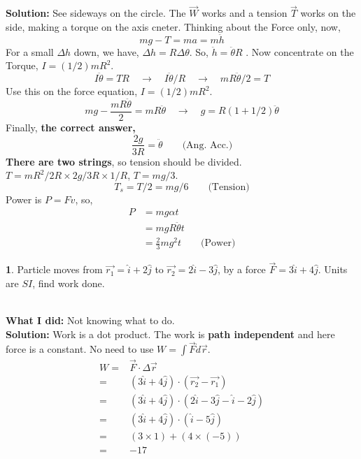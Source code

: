\documentclass[a4paper]{article}
\theoremstyle{definition}
\newtheorem{prob}{ \framebox[0.09\textwidth]{{\sffamily Pr}} }
\newcommand{\pr}[1]{ \begin{tcolorbox} \begin{prob} 
    #1 
\end{prob} 
   \end{tcolorbox}\ 
   \\
 }
\begin{document}
\textbf{Solution:} See sideways on the circle. The $\vec{W}$ works and a tension $\vec{T}$ works on the side, making a torque on the axis cneter. 
Thinking about the Force only, now,
\begin{equation}
mg - T = ma = m \ddot{h}
\end{equation}
For a small $\Delta h$ down, we have, $\Delta h = R \Delta \theta$. So,
$\ddot{h} = \ddot{\theta} R$ .
Now concentrate on the Torque, $I = (1/2) mR^2$.
\begin{equation}
I \ddot{\theta} = TR \quad \rightarrow \quad I \ddot{\theta} /R \quad \rightarrow \quad mR\ddot{\theta} /2  = T
\end{equation}
Use this on the force equation, $I = (1/2) mR^2$.
\begin{equation}
mg - \frac{mR \ddot{\theta}}{2} = mR \ddot{\theta} 
\quad
\longrightarrow
\quad 
g = R (1+ 1/2) \ddot{\theta} 
\end{equation}
Finally, \textbf{the correct answer,} 
\begin{equation}
\frac{2g}{3R} = \ddot{\theta} \qquad \text{(Ang. Acc.)}
\end{equation}
\textbf{There are two strings}, so tension should be divided. $T = mR^2/2R \times 2g/3R \times 1/R$, $T = mg/3$.
\begin{equation}
T_s = T/2 = mg/6 \qquad \text{(Tension)}
\end{equation}
Power is $P = Fv$, so, 
\begin{align*}
P &= mg \alpha t\\ 
&= mg R \ddot{\theta} t \\
&= \frac{2}{3} mg^2 t \qquad \text{(Power)} 
\end{align*}
\pr{Particle moves from $\vec{r_1} = \hat{i} + 2 \hat{j}$ to $\vec{r_2} = 2 \hat{i} - 3 \hat{j} $,
by a force $\vec{F} = 3 \hat{i} + 4 \hat{j}$. Units are $SI$, find work done.}
\textbf{What I did:} Not knowing what to do.\\
\textbf{Solution:} Work is a dot product. The work is \textbf{path independent}
and here force is a constant. No need to use $W = \int \vec{F} \dot d\vec{r}$.
\begin{align*}
W =& \vec{F} \cdot \Delta \vec{r} \\
=& (3 \hat{i} + 4 \hat{j} ) \cdot (\vec{r_2} - \vec{r_1}) \\
=& (3 \hat{i} + 4 \hat{j} ) \cdot ( 2 \hat{i} - 3 \hat{j} -
\hat{i} - 2 \hat{j} ) \\
=& (3 \hat{i} + 4 \hat{j} ) \cdot ( \hat{i} - 5 \hat{j}) \\
=& (3 \times 1) + (4 \times (-5)) \\
=& -17
\end{align*}
\end{document}
